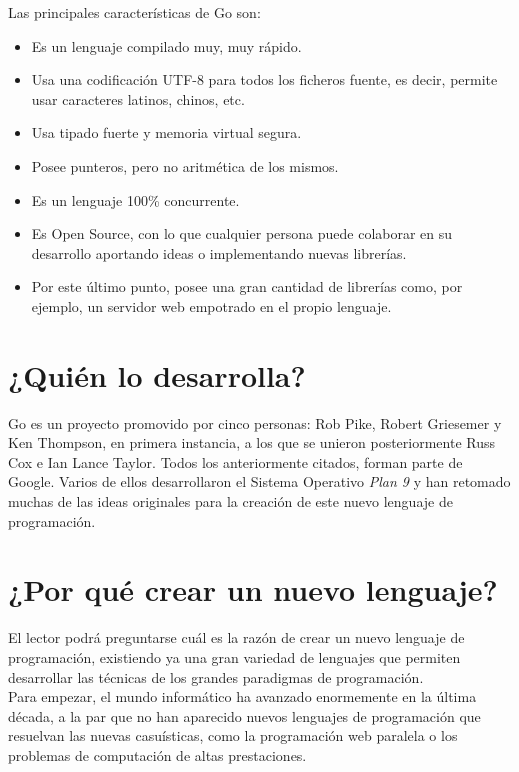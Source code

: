 Las principales características de Go son:

\begin{itemize}
	\item Es un lenguaje compilado muy, muy rápido.
	\item Usa una codificación UTF-8 para todos los ficheros fuente, es decir, permite usar
caracteres latinos, chinos, etc.  
	\item Usa tipado fuerte y memoria virtual segura.
	\item Posee punteros, pero no aritmética de los mismos.
	\item Es un lenguaje 100\% concurrente.
	\item Es Open Source, con lo que cualquier persona puede colaborar en su desarrollo
aportando ideas o implementando nuevas librerías.
	\item Por este último punto, posee una gran cantidad de librerías como, por
	ejemplo, un servidor web empotrado en el propio lenguaje.
\end{itemize}

\section{¿Quién lo desarrolla?}

Go es un proyecto promovido por cinco personas: Rob Pike, Robert Griesemer y Ken
Thompson, en primera instancia, a los que se unieron posteriormente Russ Cox
e Ian Lance Taylor. Todos los anteriormente citados, forman parte de
Google\texttrademark. Varios de ellos desarrollaron el Sistema Operativo
\emph{Plan 9} y han retomado muchas de las ideas originales para la creación
de este nuevo lenguaje de programación.

\section{¿Por qué crear un nuevo lenguaje?}

El lector podrá preguntarse cuál es la razón de crear un nuevo lenguaje de
programación, existiendo ya una gran variedad de lenguajes que permiten
desarrollar las técnicas de los grandes paradigmas de programación\cite{PVanRoy}.\\

Para empezar, el mundo informático ha avanzado enormemente en la última década,
a la par que no han aparecido nuevos lenguajes de programación que resuelvan las
nuevas casuísticas, como la programación web paralela o los problemas de
computación de altas prestaciones.\\

